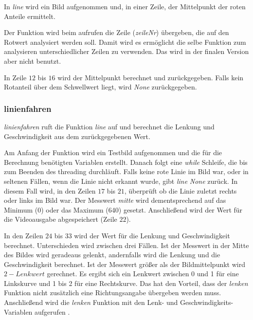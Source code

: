 \documentclass[a4paper, 12pt]{scrartcl}
\begin{document}
In \textit{line} wird ein Bild aufgenommen und, in einer Zeile, der Mittelpunkt der roten Anteile ermittelt.

Der Funktion wird beim aufrufen die Zeile (\textit{zeileNr}) übergeben, die auf den Rotwert analysiert werden soll. Damit wird es ermöglicht die selbe Funktion zum analysieren unterschiedlicher Zeilen zu verwenden. Das wird in der finalen Version aber nicht benutzt.

In Zeile $12$ bis $16$ wird der Mittelpunkt berechnet und zurückgegeben. Falls kein Rotanteil über dem Schwellwert liegt, wird \textit{None} zurückgegeben.

\newpage
\subsubsection{linienfahren}	%


\textit{linienfahren} ruft die Funktion \textit{line} auf und berechnet die Lenkung und Geschwindigkeit aus dem zurückgegebenen Wert.

Am Anfang der Funktion wird ein Testbild aufgenommen und die für die Berechnung benötigten Variablen erstellt. Danach folgt eine \textit{while} Schleife, die bis zum Beenden des threading durchläuft.
Falls keine rote Linie im Bild war, oder in seltenen Fällen, wenn die Linie nicht erkannt wurde, gibt \textit{line} \textit{None} zurück. In diesem Fall wird, in den Zeilen $17$ bis $21$, überprüft ob die Linie zuletzt rechts oder links im Bild war. Der Messwert \textit{mitte} wird dementsprechend auf das Minimum (0) oder das Maximum (640) gesetzt. Anschließend wird der Wert für die Videoausgabe abgespeichert (Zeile $22$).

In den Zeilen $24$ bis $33$ wird der Wert für die Lenkung und Geschwindigkeit berechnet. Unterschieden wird zwischen drei Fällen. Ist der Messwert in der Mitte des Bildes wird geradeaus gelenkt, andernfalls wird die Lenkung und die Geschwindigkeit berechnet. Ist der Messwert größer als der Bildmittelpunkt wird $2-\textit{Lenkwert}$ gerechnet. Es ergibt sich ein Lenkwert zwischen 0 und 1 für eine Linkskurve und 1 bis 2 für eine Rechtskurve. Das hat den Vorteil, dass der \textit{lenken} Funktion nicht zusätzlich eine Richtungsangabe übergeben werden muss. Anschließend wird die \textit{lenken} Funktion mit den Lenk- und Geschwindigkeits-Variablen aufgerufen .\\
\end{document}
